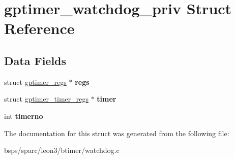 \hypertarget{structgptimer__watchdog__priv}{}\section{gptimer\+\_\+watchdog\+\_\+priv Struct Reference}
\label{structgptimer__watchdog__priv}
\subsection*{Data Fields}
\begin{DoxyCompactItemize}
\item 
\mbox{\label{structgptimer__watchdog__priv_aaf27ec95b2d8d15955586b58e75d5a6e}} 
struct \mbox{\hyperlink{structgptimer__regs}{gptimer\+\_\+regs}} $\ast$ {\bfseries regs}
\item 
\mbox{\label{structgptimer__watchdog__priv_ad8e8b5b4696f5cb871c93b709ab84f6d}} 
struct \mbox{\hyperlink{structgptimer__timer__regs}{gptimer\+\_\+timer\+\_\+regs}} $\ast$ {\bfseries timer}
\item 
\mbox{\label{structgptimer__watchdog__priv_a13d5bcfb39e4f438dd193db61e08c5ef}} 
int {\bfseries timerno}
\end{DoxyCompactItemize}


The documentation for this struct was generated from the following file\+:\begin{DoxyCompactItemize}
\item 
bsps/sparc/leon3/btimer/watchdog.\+c\end{DoxyCompactItemize}
